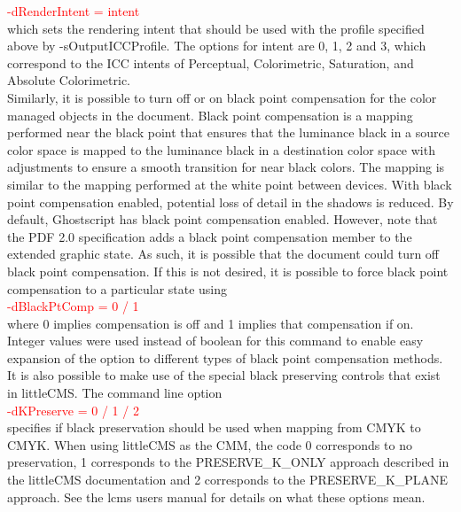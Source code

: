 \documentclass[12pt,notitlepage]{article}
\begin{document}
\textcolor{red}{-dRenderIntent = intent}\\

\noindent which sets the rendering intent that should be used with the profile specified above by -sOutputICCProfile. The options for intent are 0, 1, 2 and 3, which correspond to the ICC intents of Perceptual, Colorimetric, Saturation, and Absolute Colorimetric.\\

Similarly, it is possible to turn off or on black point compensation for the color managed objects in the document.  Black point compensation is a mapping performed near the black point that ensures that the luminance black in a source color space is mapped to the luminance black in a destination color space with adjustments to ensure a smooth transition for near black colors.  The mapping is similar to the mapping performed at the white point between devices. With black point compensation enabled, potential loss of detail in the shadows is reduced.   By default, Ghostscript has black point compensation  enabled.  However, note that the PDF 2.0 specification adds a black point compensation member to the extended graphic state.  As such, it is possible that the document could turn off black point compensation.   If this is not desired, it is possible to force black point compensation to a particular state using\\

\textcolor{red}{-dBlackPtComp = 0 / 1}\\

\noindent where 0 implies compensation is off and 1 implies that compensation if on.  Integer values were used instead of boolean for this command to enable easy expansion of the option to different types of black point compensation methods.\\

It is also possible to make use of the special black preserving controls that exist in littleCMS.  The command line option\\

\textcolor{red}{-dKPreserve = 0 / 1 / 2}\\

\noindent specifies if black preservation should be used when mapping from CMYK to CMYK.   When using littleCMS as the CMM, the code 0
corresponds to no preservation, 1 corresponds to the PRESERVE\_K\_ONLY approach described in the littleCMS documentation and 2 corresponds to the PRESERVE\_K\_PLANE approach.
See the lcms users manual for details on what these options mean.\\
\end{document}
